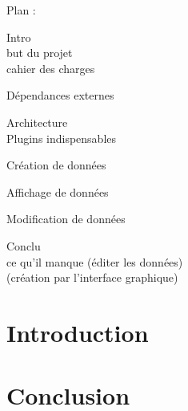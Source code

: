 \documentclass[a4paper]{report}
\begin{document}



\tableofcontents

Plan : 

	Intro\\
		but du projet\\
		cahier des charges

	Dépendances externes

	Architecture  \\
		Plugins indispensables

		Création de données

		Affichage de données

		Modification de données

	Conclu\\
		ce qu'il manque (éditer les données)\\
		(création par l'interface graphique)
		


\chapter*{Introduction}
%


\chapter*{Conclusion}
%
\end{document}
